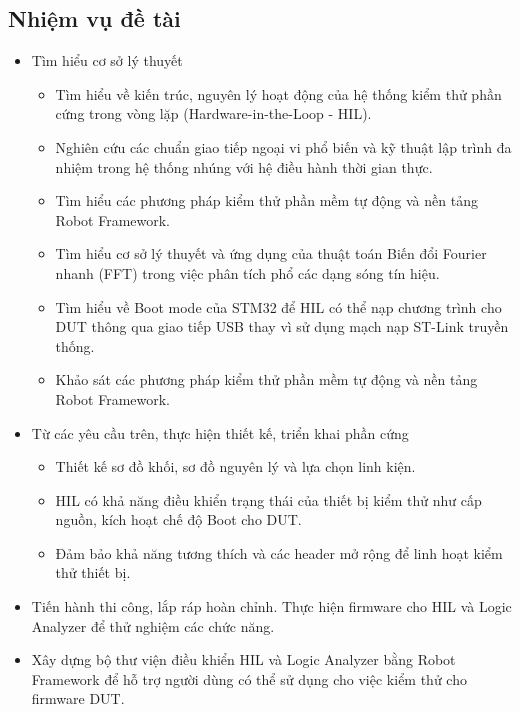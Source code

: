 \subsection{Nhiệm vụ đề tài}
\begin{itemize}
    \item Tìm hiểu cơ sở lý thuyết
    \begin{itemize}
        \item[-] Tìm hiểu về kiến trúc, nguyên lý hoạt động của hệ thống kiểm thử phần cứng trong vòng lặp (Hardware-in-the-Loop - HIL).
        \item[-] Nghiên cứu các chuẩn giao tiếp ngoại vi phổ biến và kỹ thuật lập trình đa nhiệm trong hệ thống nhúng với hệ điều hành thời gian thực.
        \item[-] Tìm hiểu các phương pháp kiểm thử phần mềm tự động và nền tảng Robot Framework.
        \item[-] Tìm hiểu cơ sở lý thuyết và ứng dụng của thuật toán Biến đổi Fourier nhanh (FFT) trong việc phân tích phổ các dạng sóng tín hiệu.
        \item[-] Tìm hiểu về Boot mode của STM32 để HIL có thể nạp chương trình cho DUT thông qua giao tiếp USB thay vì sử dụng mạch nạp ST-Link truyền thống.
        \item[-] Khảo sát các phương pháp kiểm thử phần mềm tự động và nền tảng Robot Framework.
    \end{itemize}

    \item Từ các yêu cầu trên, thực hiện thiết kế, triển khai phần cứng
    \begin{itemize}
        \item[-] Thiết kế sơ đồ khối, sơ đồ nguyên lý và lựa chọn linh kiện.
        \item[-] HIL có khả năng điều khiển trạng thái của thiết bị kiểm thử như cấp nguồn, kích hoạt chế độ Boot cho DUT.
        \item[-] Đảm bảo khả năng tương thích và các header mở rộng để linh hoạt kiểm thử thiết bị.
    \end{itemize}

    \item Tiến hành thi công, lắp ráp hoàn chỉnh. Thực hiện firmware cho HIL và Logic Analyzer để thử nghiệm các chức năng.

    \item Xây dựng bộ thư viện điều khiển HIL và Logic Analyzer bằng Robot Framework để hỗ trợ người dùng có thể sử dụng cho việc kiểm thử cho firmware DUT.


\end{itemize}
